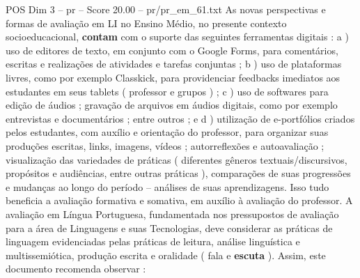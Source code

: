 \begin{textsample}{POS Dim 3 – pr – Score 20.00 – pr/pr\_em\_61.txt}
As novas perspectivas e formas de avaliação em LI no Ensino Médio, no presente contexto socioeducacional, \textbf{contam} com o suporte das seguintes ferramentas digitais : a ) uso de editores de texto, em conjunto com o Google Forms, para comentários, escritas e realizações de atividades e tarefas conjuntas ; b ) uso de plataformas livres, como por exemplo Classkick, para providenciar feedbacks imediatos aos estudantes em seus tablets ( professor e grupos ) ; c ) uso de softwares para edição de áudios ; gravação de arquivos em áudios digitais, como por exemplo entrevistas e documentários ; entre outros ; e d ) utilização de e-portfólios criados pelos estudantes, com auxílio e orientação do professor, para organizar suas produções escritas, links, imagens, vídeos ; autorreflexões e autoavaliação ; visualização das variedades de práticas ( diferentes gêneros textuais/discursivos, propósitos e audiências, entre outras práticas ), comparações de suas progressões e mudanças ao longo do período – análises de suas aprendizagens.
Isso tudo beneficia a avaliação formativa e somativa, em auxílio à avaliação do professor.
A avaliação em Língua Portuguesa, fundamentada nos pressupostos de avaliação para a área de Linguagens e suas Tecnologias, deve considerar as práticas de linguagem evidenciadas pelas práticas de leitura, análise linguística e multissemiótica, produção escrita e oralidade ( fala e \textbf{escuta} ).
Assim, este documento recomenda observar :

\end{textsample}
